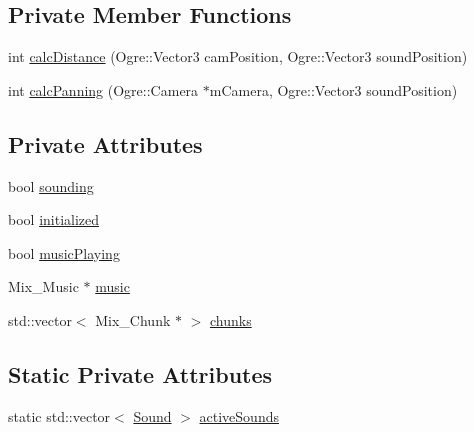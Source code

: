 \subsection*{Private Member Functions}
\begin{DoxyCompactItemize}
\item 
int \hyperlink{classSoundManager_a853d33720f1d07d10d81771217d6aad1}{calc\-Distance} (Ogre\-::\-Vector3 cam\-Position, Ogre\-::\-Vector3 sound\-Position)
\item 
int \hyperlink{classSoundManager_aa39dc3ca78b74a7eb8d3535ff9a50f0d}{calc\-Panning} (Ogre\-::\-Camera $\ast$m\-Camera, Ogre\-::\-Vector3 sound\-Position)
\end{DoxyCompactItemize}
\subsection*{Private Attributes}
\begin{DoxyCompactItemize}
\item 
bool \hyperlink{classSoundManager_a099128ef18dacf43acd4942aedf712a2}{sounding}
\item 
bool \hyperlink{classSoundManager_a4d95e056b1fe09c91fc601e8062b9b9b}{initialized}
\item 
bool \hyperlink{classSoundManager_a448beccb044e3cbdbe72262f73bd464c}{music\-Playing}
\item 
Mix\-\_\-\-Music $\ast$ \hyperlink{classSoundManager_add68d7295ec04f3d1fb351199ef943a3}{music}
\item 
std\-::vector$<$ Mix\-\_\-\-Chunk $\ast$ $>$ \hyperlink{classSoundManager_a591ec09cf6486bc6ff62c458b1718630}{chunks}
\end{DoxyCompactItemize}
\subsection*{Static Private Attributes}
\begin{DoxyCompactItemize}
\item 
static std\-::vector$<$ \hyperlink{structSound}{Sound} $>$ \hyperlink{classSoundManager_a31f26ed9971efa0d30d57cdd2b60854f}{active\-Sounds}
\end{DoxyCompactItemize}



